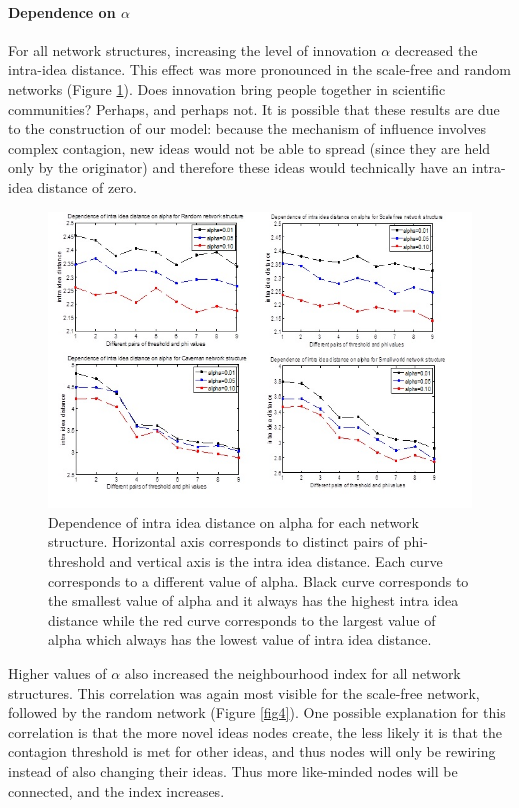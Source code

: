 \paragraph{Dependence on $\alpha$}
For all network structures, increasing the level of innovation $\alpha$ decreased the intra-idea distance. This effect was more pronounced in the scale-free and random networks (Figure \ref{fig3}). Does innovation bring people together in scientific communities? Perhaps, and perhaps not. It is possible that these results are due to the construction of our model: because the mechanism of influence involves complex contagion, new ideas would not be able to spread (since they are held only by the originator) and therefore these ideas would technically have an intra-idea distance of zero.

\begin{figure}
[htp]
\begin{center}
\includegraphics{Fig3}
\end{center}
\caption{Dependence of intra idea distance on alpha for each network structure. Horizontal axis corresponds to distinct pairs of phi-threshold and vertical axis is the intra idea distance. Each curve corresponds to a different value of alpha. Black curve corresponds to the smallest value of alpha and it always has the highest intra idea distance while the red curve corresponds to the largest value of alpha which always has the lowest value of intra idea distance.}
\label {fig3}
\end{figure}

Higher values of $\alpha$ also increased the neighbourhood index for all network structures. This correlation was again most visible for the scale-free network, followed by the random network (Figure \ref{fig4}). One possible explanation for this correlation is that the more novel ideas nodes create, the less likely it is that the contagion threshold is met for other ideas, and thus nodes will only be rewiring instead of also changing their ideas. Thus more like-minded nodes will be connected, and the index increases. 

